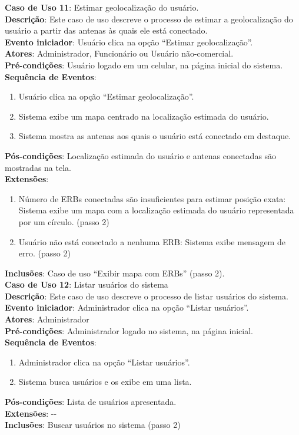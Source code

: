 \documentclass[]{politex}
\begin{document}
\noindent \textbf{Caso de Uso 11}: Estimar geolocalização do usuário. \\
\textbf{Descrição}: Este caso de uso descreve o processo de estimar a
geolocalização do usuário a partir das antenas às quais ele está conectado. \\
\textbf{Evento iniciador}: Usuário clica na opção ``Estimar geolocalização''. \\
\textbf{Atores}: Administrador, Funcionário ou Usuário não-comercial. \\
\textbf{Pré-condições}: Usuário logado em um celular, na página inicial do
sistema. \\
\textbf{Sequência de Eventos}:
\begin{enumerate}
\item Usuário clica na opção ``Estimar geolocalização''.
\item Sistema exibe um mapa centrado na localização estimada do usuário.
\item Sistema mostra as antenas aos quais o usuário está conectado em destaque.
\end{enumerate}
\textbf{Pós-condições}: Localização estimada do usuário e antenas conectadas são
mostradas na tela. \\
\textbf{Extensões}:
\begin{enumerate}
\item Número de ERBs conectadas são insuficientes para estimar posição exata:
Sistema exibe um mapa com a localização estimada do usuário representada por um
círculo. (passo 2)
\item Usuário não está conectado a nenhuma ERB: Sistema exibe mensagem de erro.
(passo 2)
\end{enumerate}
\textbf{Inclusões}: Caso de uso ``Exibir mapa com ERBs'' (passo 2). \\

\noindent \textbf{Caso de Uso 12}: Listar usuários do sistema \\
\textbf{Descrição}: Este caso de uso descreve o processo de listar usuários do
sistema. \\
\textbf{Evento iniciador}: Administrador clica na opção ``Listar usuários''. \\
\textbf{Atores}: Administrador \\
\textbf{Pré-condições}: Administrador logado no sistema, na página inicial. \\
\textbf{Sequência de Eventos}:
\begin{enumerate}
\item Administrador clica na opção ``Listar usuários''.
\item Sistema busca usuários e os exibe em uma lista.
\end{enumerate}
\textbf{Pós-condições}: Lista de usuários apresentada. \\
\textbf{Extensões}: -{}- \\
\textbf{Inclusões}: Buscar usuários no sistema (passo 2) \\
\end{document}
